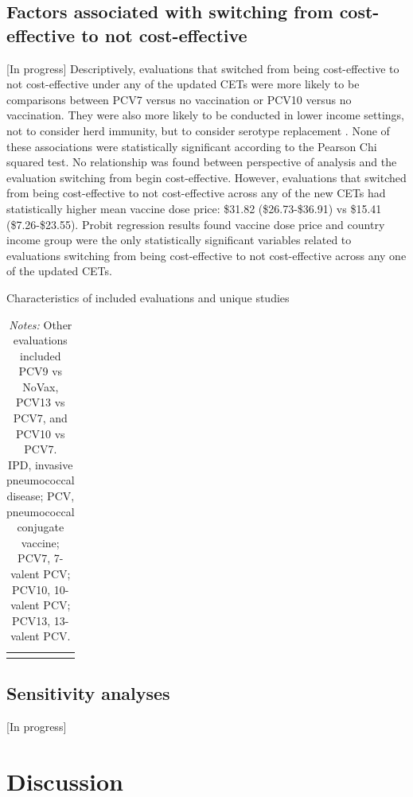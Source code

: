 \documentclass[12pt]{article}
\begin{document}
\subsection*{Factors associated with switching from cost-effective to not cost-effective}
[In progress]
Descriptively, evaluations that switched from being cost-effective to not cost-effective under any of the updated CETs were more likely to be comparisons between PCV7 versus no vaccination or PCV10 versus no vaccination. They were also more likely to be conducted in lower income settings, not to consider herd immunity, but to consider serotype replacement . None of these associations were statistically significant according to the Pearson Chi squared test. No relationship was found between perspective of analysis and the evaluation switching from begin cost-effective. However, evaluations that switched from being cost-effective to not cost-effective across any of the new CETs had statistically higher mean vaccine dose price: \$31.82 (\$26.73-\$36.91) vs \$15.41 (\$7.26-\$23.55).  Probit regression results found vaccine dose price and country income group were the only statistically significant variables related to evaluations switching from being cost-effective to not cost-effective across any one of the updated CETs.




\begin{table}[H]
    \centering \singlespacing \small
    \caption{Characteristics of included evaluations and unique studies}
    \begin{tabular}{|L{3.5cm}|L{4cm}|L{3cm}|R{3cm}|}
        \hline
    \end{tabular}
    \label{tab_likely_switch}
    \caption*{\footnotesize \textit{Notes:} Other evaluations included PCV9 vs NoVax, PCV13 vs PCV7, and PCV10 vs PCV7. \\
    IPD, invasive pneumococcal disease; PCV, pneumococcal conjugate vaccine; PCV7, 7-valent PCV; PCV10, 10-valent PCV; PCV13, 13-valent PCV. 
}
\end{table}




\subsection*{Sensitivity analyses}
[In progress]


\section*{Discussion}
\end{document}

